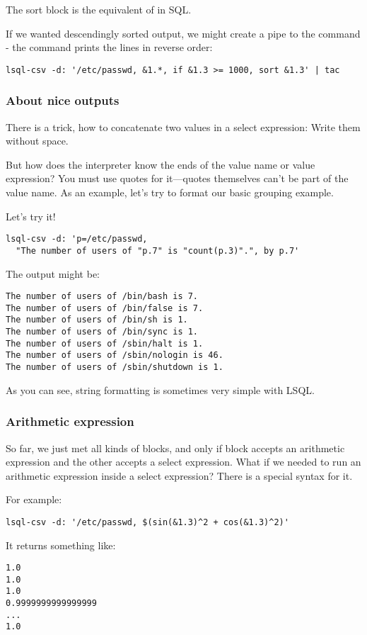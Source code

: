 The sort block is the equivalent of  in SQL.

If we wanted descendingly sorted output, we might create a pipe to the  command - the  command prints the lines in reverse order:
\begin{verbatim}
lsql-csv -d: '/etc/passwd, &1.*, if &1.3 >= 1000, sort &1.3' | tac
\end{verbatim}

\subsubsection{About nice outputs}
There is a trick, how to concatenate two values in a select expression: Write them without space.

But how does the interpreter know the ends of the value name or value expression? You must use quotes for it---quotes themselves can't be part of the value name.
As an example, let's try to format our basic grouping example.

Let's try it!
\begin{verbatim}
lsql-csv -d: 'p=/etc/passwd, 
  "The number of users of "p.7" is "count(p.3)".", by p.7'
\end{verbatim}
The output might be:
\begin{verbatim}
The number of users of /bin/bash is 7.
The number of users of /bin/false is 7.
The number of users of /bin/sh is 1.
The number of users of /bin/sync is 1.
The number of users of /sbin/halt is 1.
The number of users of /sbin/nologin is 46.
The number of users of /sbin/shutdown is 1.
\end{verbatim}

As you can see, string formatting is sometimes very simple with LSQL.

\subsubsection{Arithmetic expression}
So far, we just met all kinds of blocks, and only if block accepts an arithmetic expression and the other accepts a select expression.
What if we needed to run an arithmetic expression inside a select expression? There is a special syntax \icode{\$(\ldots)} for it.

For example:
\begin{verbatim}
lsql-csv -d: '/etc/passwd, $(sin(&1.3)^2 + cos(&1.3)^2)'
\end{verbatim}

It returns something like:
\begin{verbatim}
1.0
1.0
1.0
0.9999999999999999
...
1.0
\end{verbatim}

